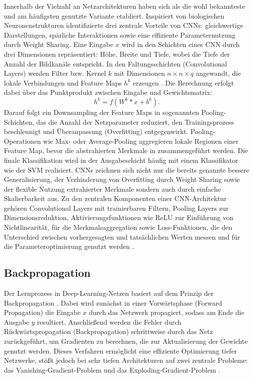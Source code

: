 Innerhalb der Vielzahl an Netzarchitekturen haben sich  als die wohl bekannteste und am häufigsten genutzte Variante etabliert. Inspiriert von biologischen Neuronenstrukturen identifizierte \cite{Goodfellow-et-al-2016} drei zentrale Vorteile von CNNs: gleichwertige Darstellungen, spärliche Interaktionen sowie eine effiziente Parameternutzung durch Weight Sharing. Eine Eingabe $x$ wird in den Schichten eines CNN durch drei Dimensionen repräsentiert: Höhe, Breite und Tiefe, wobei die Tiefe der Anzahl der Bildkanäle entspricht. In den Faltungsschichten (Convolutional Layers) werden Filter bzw. Kernel $k$ mit Dimensionen $n \times n \times q$ angewandt, die lokale Verbindungen und Feature Maps $h^k$ erzeugen \cite{Alzubaidi2021}. Die Berechnung erfolgt dabei über das Punktprodukt zwischen Eingabe und Gewichtsmatrix:  
\begin{equation}
h^k = f(W^k \ast x + b^k).
\end{equation}
Darauf folgt ein Downsampling der Feature Maps in sogenannten Pooling-Schichten, das die Anzahl der Netzparameter reduziert, den Trainingsprozess beschleunigt und Überanpassung (Overfitting) entgegenwirkt. Pooling-Operationen wie Max- oder Average-Pooling aggregieren lokale Regionen einer Feature Map, bevor die abstrahierten Merkmale in  zusammengeführt werden. Die finale Klassifikation wird in der Ausgabeschicht häufig mit einem Klassifikator wie der \acrfull{SVM} realisiert. CNNs zeichnen sich nicht nur die bereits genannte bessere Generalisierung, der Verhinderung von Overfitting durch Weight Sharing sowie der flexible Nutzung extrahierter Merkmale sondern auch durch einfache Skalierbarkeit aus. Zu den zentralen Komponenten einer \acrshort{CNN}-Architektur gehören Convolutional Layers mit trainierbaren Filtern, Pooling Layers zur Dimensionsreduktion, Aktivierungsfunktionen wie \acrfull{ReLU} zur Einführung von Nichtlinearität,  für die Merkmalsaggregation sowie Loss-Funktionen, die den Unterschied zwischen vorhergesagten und tatsächlichen Werten messen und für die Parameteroptimierung genutzt werden \cite{Alzubaidi2021}.

\subsection{Backpropagation}

Der Lernprozess in Deep-Learning-Netzen basiert auf dem Prinzip der Backpropagation \cite{Goodfellow-et-al-2016}. Dabei wird zunächst in einer Vorwärtsphase (Forward Propagation) die Eingabe $x$ durch das Netzwerk propagiert, sodass am Ende die Ausgabe $y$ resultiert. Anschließend werden die Fehler durch Rückwärtspropagation (Backpropagation) schrittweise durch das Netz zurückgeführt, um Gradienten zu berechnen, die zur Aktualisierung der Gewichte genutzt werden. Dieses Verfahren ermöglicht eine effiziente Optimierung tiefer Netzwerke, stößt jedoch bei sehr tiefen Architekturen auf zwei zentrale Probleme: das Vanishing-Gradient-Problem und das Exploding-Gradient-Problem \cite{Alzubaidi2021}.  

